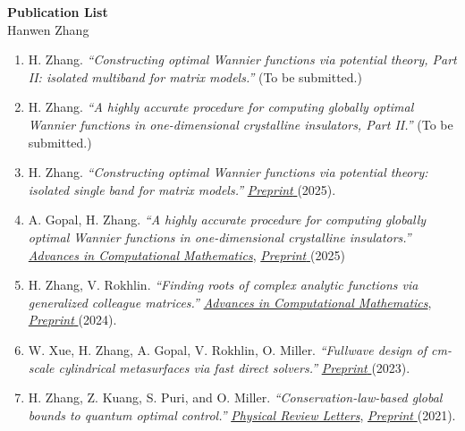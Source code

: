 \documentclass[11pt]{article}
\begin{document}
	
	\begin{center}
		{\Large \textbf{Publication List}}\\[6pt]
		{\large Hanwen Zhang}
	\end{center}
	
	\vspace{1em}
	
	\begin{enumerate}[leftmargin=1.5em, itemsep=0.6em]
		
		\item H. Zhang. \textit{“Constructing optimal Wannier functions via potential theory, Part II: isolated multiband for matrix models.”} (To be submitted.)
		
		\item H. Zhang. \textit{“A highly accurate procedure for computing globally optimal Wannier functions in one-dimensional crystalline insulators, Part II.”} (To be submitted.)
		
		\item H. Zhang. \textit{“Constructing optimal Wannier functions via potential theory: isolated single band for matrix models.”} \href{https://arxiv.org/abs/2502.08641}{\color{blue} \emph{Preprint} }(2025).
		
		\item A. Gopal, H. Zhang. \textit{“A highly accurate procedure for computing globally optimal Wannier functions in one-dimensional crystalline insulators.”} \href{https://link.springer.com/article/10.1007/s10444-025-10266-4}{\color{blue}  \emph{Advances in Computational Mathematics}},   \href{https://arxiv.org/abs/2409.04369}{\color{blue} \emph{Preprint} }(2025)
		
		\item H. Zhang, V. Rokhlin. \textit{“Finding roots of complex analytic functions via generalized colleague matrices.”} \href{https://link.springer.com/article/10.1007/s10444-024-10174-z}{\color{blue}  \emph{Advances in Computational Mathematics}},    \href{https://arxiv.org/abs/2307.14494}{\color{blue} \emph{Preprint} }(2024).
		
		\item W. Xue, H. Zhang, A. Gopal, V. Rokhlin, O. Miller. \textit{“Fullwave design of cm-scale cylindrical metasurfaces via fast direct solvers.”} \href{https://arxiv.org/abs/2308.08569}{\color{blue} \emph{Preprint} }(2023).
		
		\item H. Zhang, Z. Kuang, S. Puri, and O. Miller. \textit{“Conservation-law-based global bounds to quantum optimal control.”} \href{https://journals.aps.org/prl/abstract/10.1103/PhysRevLett.127.110506}{\color{blue}  \emph{Physical Review Letters}},    \href{https://arxiv.org/abs/2105.06054}{\color{blue} \emph{Preprint} }(2021).


\end{enumerate}
\end{document}
